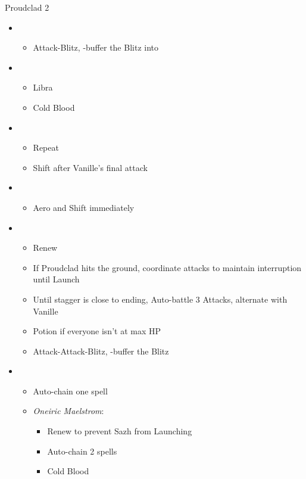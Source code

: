 \begin{battle}{Proudclad 2}
\begin{multicols}{2}
\begin{itemize}
    \item \second
    \begin{itemize}
        \item Attack-Blitz, \rav-buffer the Blitz into
    \end{itemize}
    \item \sixth
    \begin{itemize}
        \item Libra
        \item Cold Blood
    \end{itemize}
    \item \fifth
    \begin{itemize}
        \item Repeat
        \item Shift after Vanille's final attack
    \end{itemize}
    \item \first
    \begin{itemize}
        \item Aero and Shift immediately
    \end{itemize}
    \item \second
    \begin{itemize}
        \item Renew
        \item If Proudclad hits the ground, coordinate attacks to maintain interruption until Launch
        \item Until stagger is close to ending, Auto-battle 3 Attacks, alternate with Vanille
        \item Potion if everyone isn't at max HP
        \item Attack-Attack-Blitz, \rav-buffer the Blitz
    \end{itemize}
    \item \third
    \begin{itemize}
        \item Auto-chain one spell
        \item \textit{Oneiric Maelstrom}:
        \begin{itemize}
            \item Renew to prevent Sazh from Launching
            \item Auto-chain 2 spells
            \item Cold Blood

\end{itemize}
\end{itemize}
\end{itemize}
\end{multicols}
\end{battle}
